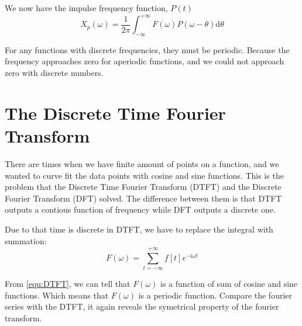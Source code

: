 \documentclass[12pt]{article}
\begin{document}
We now have the impulse frequency function, $P(t)$
$$ X_p(\omega) = \frac{1}{2\pi} \int_{-\infty}^{+\infty} F(\omega)P(\omega-\theta) \mathrm{d}\theta $$

For any functions with discrete frequencies, they must be periodic. 
Because the frequency approaches zero for aperiodic functions, 
and we could not approach zero with discrete numbers.








\section{The Discrete Time Fourier Transform}
There are times when we have finite amount of points on a function, 
and we wanted to curve fit the data points with cosine and sine functions.
This is the problem that the Discrete Time Fourier Transform (DTFT) and the Discrete Fourier Transform (DFT) solved. 
The difference between them is that DTFT outputs a contious function of frequency while DFT outputs a discrete one. 

Due to that time is discrete in DTFT, we have to replace the integral with summation: 
\begin{equation}
    F(\omega) = \sum_{t=-\infty}^{+\infty} f[t] e^{-\mathrm{i}\omega t} 
    \label{equ:DTFT}
\end{equation}

From \eqref{equ:DTFT}, we can tell that $F(\omega)$ is a function of sum of cosine and sine functions. 
Which means that $F(\omega)$ is a periodic function. 
Compare the fourier series with the DTFT, it again reveals the symetrical property of the fourier transform. 
\end{document}
